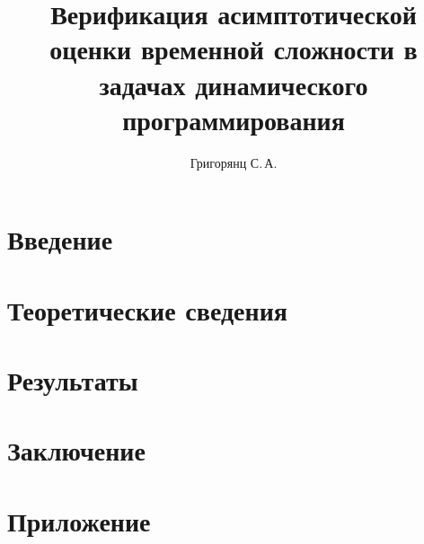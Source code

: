 \documentclass{mipt-thesis-bs}
\title{Верификация асимптотической оценки временной сложности в задачах динамического программирования}
\author{Григорянц С.\,А.}
\begin{document}
\newtheorem{lemma}{Лемма}[section]
\newtheorem{corollary}{Следствие}[section]
\newtheorem{proposition}{Утверждение}[section]
\newtheorem{remark}{Замечание}[section]
\newtheorem{fact}{Факт}[section]
\newtheorem{example}{Пример}[section]
\newtheorem{definition}{Определение}[section]

{\topsep}{\topsep}%
{\itshape}{}%
{\bfseries}{}%
{\newline}{}%
\theoremstyle{break}
\newtheorem{theorem}{Теорема}[section]


\frontmatter
\titlecontents

\mainmatter


\chapter{Введение}


\chapter{Теоретические сведения}


\chapter{Результаты}


\chapter{Заключение}


\chapter{Приложение}



\backmatter

\printbib


\end{document}

